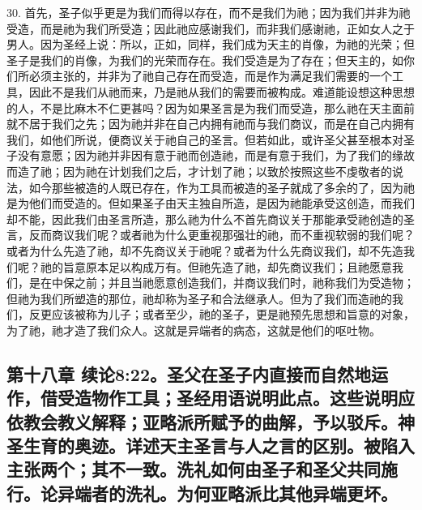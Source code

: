 30. 首先，圣子似乎更是为我们而得以存在，而不是我们为祂；因为我们并非为祂受造，而是祂为我们所受造；因此祂应感谢我们，而非我们感谢祂，正如女人之于男人。因为圣经上说：所以，正如，同样，我们成为天主的肖像，为祂的光荣；但圣子是我们的肖像，为我们的光荣而存在。我们受造是为了存在；但天主的，如你们所必须主张的，并非为了祂自己存在而受造，而是作为满足我们需要的一个工具，因此不是我们从祂而来，乃是祂从我们的需要而被构成。难道能设想这种思想的人，不是比麻木不仁更甚吗？因为如果圣言是为我们而受造，那么祂在天主面前就不居于我们之先；因为祂并非在自己内拥有祂而与我们商议，而是在自己内拥有我们，如他们所说，便商议关于祂自己的圣言。但若如此，或许圣父甚至根本对圣子没有意愿；因为祂并非因有意于祂而创造祂，而是有意于我们，为了我们的缘故而造了祂；因为祂在计划我们之后，才计划了祂；以致於按照这些不虔敬者的说法，如今那些被造的人既已存在，作为工具而被造的圣子就成了多余的了，因为祂是为他们而受造的。但如果圣子由天主独自所造，是因为祂能承受这创造，而我们却不能，因此我们由圣言所造，那么祂为什么不首先商议关于那能承受祂创造的圣言，反而商议我们呢？或者祂为什么更重视那强壮的祂，而不重视软弱的我们呢？或者为什么先造了祂，却不先商议关于祂呢？或者为什么先商议我们，却不先造我们呢？祂的旨意原本足以构成万有。但祂先造了祂，却先商议我们；且祂愿意我们，是在中保之前；并且当祂愿意创造我们，并商议我们时，祂称我们为受造物；但祂为我们所塑造的那位，祂却称为圣子和合法继承人。但为了我们而造祂的我们，反更应该被称为儿子；或者至少，祂的圣子，更是祂预先思想和旨意的对象，为了祂，祂才造了我们众人。这就是异端者的病态，这就是他们的呕吐物。\par


\subsection{第十八章 续论8:22。圣父在圣子内直接而自然地运作，借受造物作工具；圣经用语说明此点。这些说明应依教会教义解释；亚略派所赋予的曲解，予以驳斥。神圣生育的奥迹。详述天主圣言与人之言的区别。被陷入主张两个；其不一致。洗礼如何由圣子和圣父共同施行。论异端者的洗礼。为何亚略派比其他异端更坏。}

